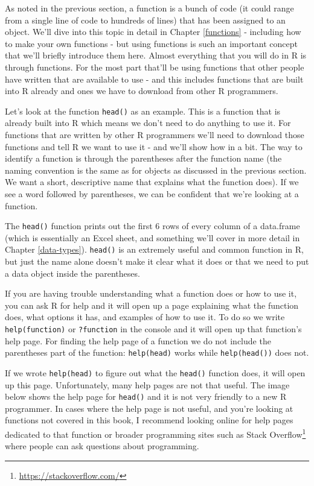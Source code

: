 \documentclass[
]{krantz}
\renewcommand{\href}[2]{#2\footnote{\url{#1}}}
\begin{document}
As noted in the previous section, a function is a bunch of
code (it could range from a single line of code to hundreds
of lines) that has been assigned to an object. We'll dive
into this topic in detail in Chapter \ref{functions} -
including how to make your own functions - but using
functions is such an important concept that we'll briefly
introduce them here. Almost everything that you will do in R
is through functions. For the most part that'll be using
functions that other people have written that are available
to use - and this includes functions that are built into R
already and ones we have to download from other R
programmers.

Let's look at the function \texttt{head()} as an example.
This is a function that is already built into R which means
we don't need to do anything to use it. For functions that
are written by other R programmers we'll need to download
those functions and tell R we want to use it - and we'll
show how in a bit. The way to identify a function is through
the parentheses after the function name (the naming
convention is the same as for objects as discussed in the
previous section. We want a short, descriptive name that
explains what the function does). If we see a word followed
by parentheses, we can be confident that we're looking at a
function.

The \texttt{head()} function prints out the first 6 rows of
every column of a data.frame (which is essentially an Excel
sheet, and something we'll cover in more detail in Chapter
\ref{data-types}). \texttt{head()} is an extremely useful
and common function in R, but just the name alone doesn't
make it clear what it does or that we need to put a data
object inside the parentheses.

If you are having trouble understanding what a function does
or how to use it, you can ask R for help and it will open up
a page explaining what the function does, what options it
has, and examples of how to use it. To do so we write
\texttt{help(function)} or \texttt{?function} in the console
and it will open up that function's help page. For finding
the help page of a function we do not include the
parentheses part of the function: \texttt{help(head)} works
while \texttt{help(head())} does not.

If we wrote \texttt{help(head)} to figure out what the
\texttt{head()} function does, it will open up this page.
Unfortunately, many help pages are not that useful. The
image below shows the help page for \texttt{head()} and it
is not very friendly to a new R programmer. In cases where
the help page is not useful, and you're looking at functions
not covered in this book, I recommend looking online for
help pages dedicated to that function or broader programming
sites such as \href{https://stackoverflow.com/}{Stack
Overflow} where people can ask questions about programming.
\end{document}

